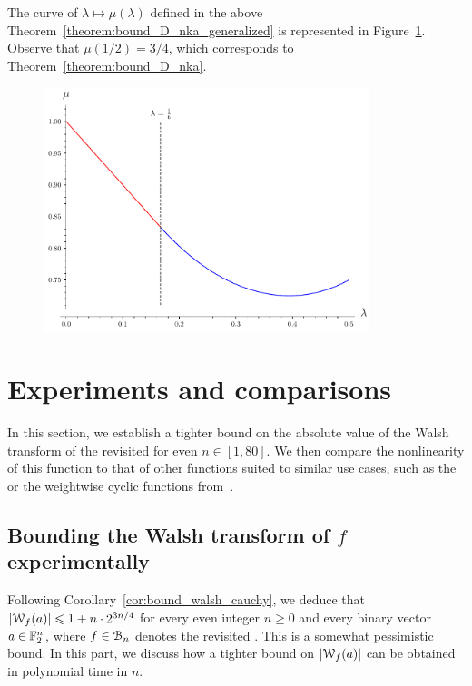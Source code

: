 \documentclass{llncs}
\begin{document}
The curve of $\lambda\mapsto\mu(\lambda)$ defined in the above Theorem~\ref{theorem:bound_D_nka_generalized} is represented in Figure~\ref{fig:curve_exponents_lambda_mu}. Observe that $\mu(1/2)=3/4$, which corresponds to Theorem~\ref{theorem:bound_D_nka}.

\begin{figure}[ht]
	\centering
	\includegraphics[width=9.5cm]{curve_exponents_lambda_mu.pdf}
    \vspace{-5mm}
	\label{fig:curve_exponents_lambda_mu}
\end{figure}

\section{Experiments and comparisons}\label{sec:expAndComp}

In this section, we establish a tighter bound on the absolute value of the Walsh transform of the revisited \hwbf{} for even $n\in[1,80]$. 
We then compare the nonlinearity of this function to that of other functions suited to similar use cases, such as the \hwbf{} or the weightwise cyclic functions from~\cite{DAM:MeaOza24}.

\subsection{Bounding the Walsh transform of $f$ experimentally}\label{sec:expwt}

Following Corollary~\ref{cor:bound_walsh_cauchy}, we deduce that $|\mathcal W_{f}(a)|\leqslant 1+n\cdot 2^{3n/4}$ for every even integer $n\geq 0$ and every binary vector $a\in\mathbb{F}_2^n$, where $f\in\mathcal{B}_n$ denotes the revisited \hwbf{}. This is a somewhat pessimistic bound. In this part, we discuss how a tighter bound on $|\mathcal W_{f}(a)|$ can be obtained in polynomial time in $n$.
\end{document}
